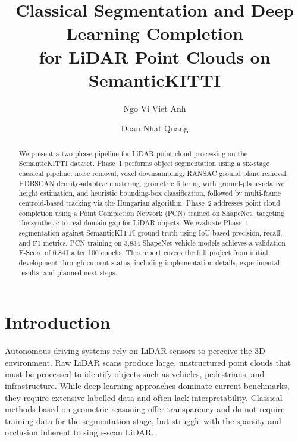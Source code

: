 \documentclass[runningheads]{llncs}
\begin{document}
\title{Classical Segmentation and Deep Learning Completion\\for LiDAR Point Clouds on SemanticKITTI}


\author{Ngo Vi Viet Anh \and
Doan Nhat Quang}



\maketitle

\begin{abstract}
We present a two-phase pipeline for LiDAR point cloud processing on the SemanticKITTI dataset. Phase~1 performs object segmentation using a six-stage classical pipeline: noise removal, voxel downsampling, RANSAC ground plane removal, HDBSCAN density-adaptive clustering, geometric filtering with ground-plane-relative height estimation, and heuristic bounding-box classification, followed by multi-frame centroid-based tracking via the Hungarian algorithm. Phase~2 addresses point cloud completion using a Point Completion Network (PCN) trained on ShapeNet, targeting the synthetic-to-real domain gap for LiDAR objects. We evaluate Phase~1 segmentation against SemanticKITTI ground truth using IoU-based precision, recall, and F1 metrics. PCN training on 3{,}834 ShapeNet vehicle models achieves a validation F-Score of 0.841 after 100 epochs. This report covers the full project from initial development through current status, including implementation details, experimental results, and planned next steps.

\end{abstract}


\section{Introduction}

Autonomous driving systems rely on LiDAR sensors to perceive the 3D environment. Raw LiDAR scans produce large, unstructured point clouds that must be processed to identify objects such as vehicles, pedestrians, and infrastructure. While deep learning approaches dominate current benchmarks, they require extensive labelled data and often lack interpretability. Classical methods based on geometric reasoning offer transparency and do not require training data for the segmentation stage, but struggle with the sparsity and occlusion inherent to single-scan LiDAR.
\end{document}
